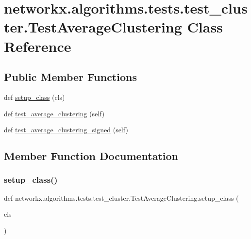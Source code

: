 \hypertarget{classnetworkx_1_1algorithms_1_1tests_1_1test__cluster_1_1TestAverageClustering}{}\section{networkx.\+algorithms.\+tests.\+test\+\_\+cluster.\+Test\+Average\+Clustering Class Reference}
\label{classnetworkx_1_1algorithms_1_1tests_1_1test__cluster_1_1TestAverageClustering}
\subsection*{Public Member Functions}
\begin{DoxyCompactItemize}
\item 
def \hyperlink{classnetworkx_1_1algorithms_1_1tests_1_1test__cluster_1_1TestAverageClustering_a398dea41b1da02d847d3559ce9729030}{setup\+\_\+class} (cls)
\item 
def \hyperlink{classnetworkx_1_1algorithms_1_1tests_1_1test__cluster_1_1TestAverageClustering_ad21be8146b6b8570739daa6eef20a383}{test\+\_\+average\+\_\+clustering} (self)
\item 
def \hyperlink{classnetworkx_1_1algorithms_1_1tests_1_1test__cluster_1_1TestAverageClustering_a1b97c3067a159e182bc3146a514438c5}{test\+\_\+average\+\_\+clustering\+\_\+signed} (self)
\end{DoxyCompactItemize}


\subsection{Member Function Documentation}
\mbox{\label{classnetworkx_1_1algorithms_1_1tests_1_1test__cluster_1_1TestAverageClustering_a398dea41b1da02d847d3559ce9729030}} 
\subsubsection{\texorpdfstring{setup\+\_\+class()}{setup\_class()}}
{\footnotesize\ttfamily def networkx.\+algorithms.\+tests.\+test\+\_\+cluster.\+Test\+Average\+Clustering.\+setup\+\_\+class (\begin{DoxyParamCaption}\item[{}]{cls }\end{DoxyParamCaption})}

